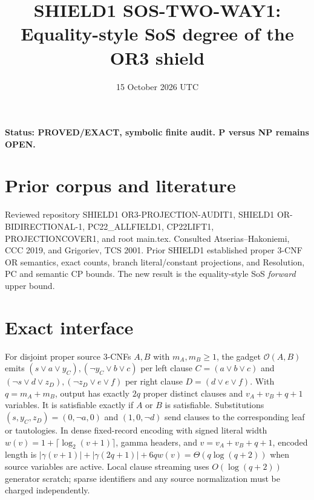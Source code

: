 \documentclass[11pt]{article}
\title{SHIELD1 SOS-TWO-WAY1: Equality-style SoS degree of the OR3 shield}
\date{15 October 2026 UTC}
\begin{document}
\maketitle
\noindent\textbf{Status: PROVED/EXACT, symbolic finite audit. P versus NP remains OPEN.}
\section{Prior corpus and literature}
Reviewed repository SHIELD1 OR3-PROJECTION-AUDIT1, SHIELD1 OR-BIDIRECTIONAL-1, PC22_ALLFIELD1, CP22LIFT1, PROJECTIONCOVER1, and root main.tex. Consulted Atserias--Hakoniemi, CCC 2019, and Grigoriev, TCS 2001. Prior SHIELD1 established proper 3-CNF OR semantics, exact counts, branch literal/constant projections, and Resolution, PC and semantic CP bounds. The new result is the equality-style SoS \emph{forward} upper bound.
\section{Exact interface}
For disjoint proper source 3-CNFs $A,B$ with $m_A,m_B\ge1$, the gadget $\mathcal O(A,B)$ emits $(s\vee a\vee y_C),(\neg y_C\vee b\vee c)$ per left clause $C=(a\vee b\vee c)$ and $(\neg s\vee d\vee z_D),(\neg z_D\vee e\vee f)$ per right clause $D=(d\vee e\vee f)$. With $q=m_A+m_B$, output has exactly $2q$ proper distinct clauses and $v_A+v_B+q+1$ variables. It is satisfiable exactly if $A$ or $B$ is satisfiable. Substitutions $(s,y_C,z_D)=(0,\neg a,0)$ and $(1,0,\neg d)$ send clauses to the corresponding leaf or tautologies. In dense fixed-record encoding with signed literal width $w(v)=1+\lceil\log_2(v+1)\rceil$, gamma headers, and $v=v_A+v_B+q+1$, encoded length is $|\gamma(v+1)|+|\gamma(2q+1)|+6qw(v)=\Theta(q\log(q+2))$ when source variables are active. Local clause streaming uses $O(\log(q+2))$ generator scratch; sparse identifiers and any source normalization must be charged independently.
\end{document}
